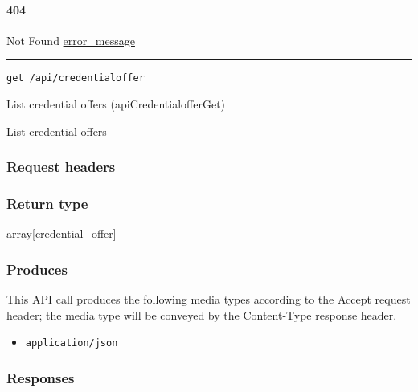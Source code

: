 \hypertarget{section-382}{%
\paragraph{404}\label{section-382}}

Not Found \protect\hyperlink{error_message}{error\_message}

\begin{center}\rule{0.5\linewidth}{\linethickness}\end{center}

\protect\hypertarget{apiCredentialofferGet}{}{}

\begin{verbatim}
get /api/credentialoffer
\end{verbatim}

List credential offers ({apiCredentialofferGet})

List credential offers

\hypertarget{request-headers-65}{%
\subsubsection{Request headers}\label{request-headers-65}}

\hypertarget{return-type-89}{%
\subsubsection{Return type}\label{return-type-89}}

array{[}\protect\hyperlink{credential_offer}{credential\_offer}{]}

\hypertarget{produces-114}{%
\subsubsection{Produces}\label{produces-114}}

This API call produces the following media types according to the
{Accept} request header; the media type will be conveyed by the
{Content-Type} response header.

\begin{itemize}
\tightlist
\item
  \texttt{application/json}
\end{itemize}

\hypertarget{responses-117}{%
\subsubsection{Responses}\label{responses-117}}

